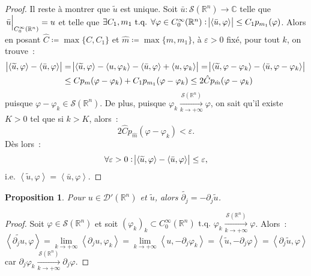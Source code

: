 \documentclass{report}
\newcommand{\C}{{\mathbb C}}
\newcommand{\R}{{\mathbb R}}
\newcommand{\scpr}[2]{\left\langle#1, #2\right\rangle}
\newcommand{\tq}{\text{ t.q. }}
\newcommand{\st}{\tq}
\newcommand{\pinfty}{{+\infty}}
\newcommand{\restr}[2]{\left.#1\vphantom{\big|}\right|_{#2}}
\newtheorem{prp}[thm]{Proposition}
\theoremstyle{definition}
\theoremstyle{remark}
\begin{document}
\begin{proof}
Il reste à montrer que $\widetilde u$ est unique. Soit $\bar u : \mathcal S(\R^n) \to \C$ telle que $\restr {\bar u}{C^\infty_0(\R^n)} = u$ et telle que $\exists C_1, m_1 \st
\forall \varphi \in C^\infty_0(\R^n) : \abs {\scpr {\bar u}\varphi} \leq C_1p_{m_1}(\varphi)$. Alors en posant $\hat C \coloneqq \max\{C, C_1\}$ et $\hat m \coloneqq \max\{m, m_1\}$,
à $\varepsilon > 0$ fixé, pour tout $k$, on trouve~:
\begin{align*}
	\abs {\scpr {\widetilde u}\varphi - \scpr {\bar u}\varphi} &= \abs {\scpr {\widetilde u}\varphi - \scpr u{\varphi_k} - \scpr {\bar u}\varphi + \scpr u{\varphi_k}}
	= \abs {\scpr {\widetilde u}{\varphi-\varphi_k} - \scpr {\bar u}{\varphi-\varphi_k}} \\
	&\leq Cp_m(\varphi-\varphi_k) + C_1p_{m_1}(\varphi-\varphi_k) \leq 2\hat Cp_{\hat m}(\varphi-\varphi_k)
\end{align*}
puisque $\varphi-\varphi_k \in \mathcal S(\R^n)$. De plus, puisque $\varphi_k \xrightarrow[k \to \pinfty]{\mathcal S(\R^n)} \varphi$, on sait qu'il existe $K > 0$ tel que si $k > K$,
alors~:
\[2\hat Cp_{\hat m}(\varphi - \varphi_k) < \varepsilon.\]
Dès lors~:
\[\forall \varepsilon > 0 : \abs {\scpr {\widetilde u}\varphi - \scpr {\bar u}\varphi} \leq \varepsilon,\]
i.e. $\scpr {\widetilde u}\varphi = \scpr {\bar u}\varphi$.
\end{proof}

\begin{prp}\label{prp:dérivée prolongement = prolongement dérivée} Pour $u \in \mathcal D'(\R^n)$ et $\widetilde u$, alors $\widetilde {\partial_j} = -\partial_j\widetilde u$.
\end{prp}

\begin{proof}Soit $\varphi \in \mathcal S(\R^n)$ et soit $(\varphi_k)_k \subset C^\infty_0(\R^n) \st \varphi_k \xrightarrow[k \to \pinfty]{\mathcal S(\R^n)} \varphi$. Alors~:
\[\scpr {\widetilde {\partial_ju}}\varphi = \lim_{k \to \pinfty}\scpr {\partial_ju}{\varphi_k} = \lim_{k \to \pinfty}\scpr u{-\partial_j\varphi_k}
= \scpr {\widetilde u}{-\partial_j\varphi} = \scpr {\partial_j\widetilde u}\varphi\]
car $\partial_j\varphi_k \xrightarrow[k \to \pinfty]{\mathcal S(\R^n)} \partial_j\varphi$.
\end{proof}
\end{document}
